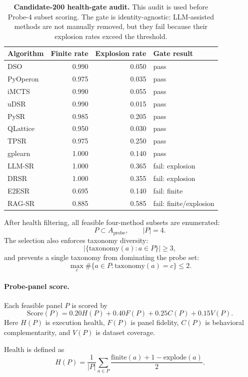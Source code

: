 \begin{table}[ht]
\centering
\small
\caption{\textbf{Candidate-200 health-gate audit.} This audit is used before Probe-4 subset scoring. The gate is identity-agnostic: LLM-assisted methods are not manually removed, but they fail because their explosion rates exceed the threshold.}
\label{tab:probe4-health-audit}
\begin{tabular}{lrrl}
\toprule
\textbf{Algorithm} & \textbf{Finite rate} & \textbf{Explosion rate} & \textbf{Gate result} \\
\midrule
DSO & 0.990 & 0.050 & pass \\
PyOperon & 0.975 & 0.035 & pass \\
iMCTS & 0.990 & 0.055 & pass \\
uDSR & 0.990 & 0.015 & pass \\
PySR & 0.985 & 0.205 & pass \\
QLattice & 0.950 & 0.030 & pass \\
TPSR & 0.975 & 0.250 & pass \\
gplearn & 1.000 & 0.140 & pass \\
LLM-SR & 1.000 & 0.365 & fail: explosion \\
DRSR & 1.000 & 0.355 & fail: explosion \\
E2ESR & 0.695 & 0.140 & fail: finite \\
RAG-SR & 0.885 & 0.585 & fail: finite/explosion \\
\bottomrule
\end{tabular}
\end{table}

After health filtering, all feasible four-method subsets are enumerated:
\[
P\subset A_{\mathrm{probe}},
\qquad
|P|=4.
\]
The selection also enforces taxonomy diversity:
\[
|\{\mathrm{taxonomy}(a):a\in P\}|\ge 3,
\]
and prevents a single taxonomy from dominating the probe set:
\[
\max_c \#\{a\in P:\mathrm{taxonomy}(a)=c\}\le 2.
\]

\paragraph{Probe-panel score.}
Each feasible panel \(P\) is scored by
\[
\mathrm{Score}(P)
=
0.20H(P)
+
0.40F(P)
+
0.25C(P)
+
0.15V(P).
\]
Here \(H(P)\) is execution health, \(F(P)\) is panel fidelity, \(C(P)\) is behavioral complementarity, and \(V(P)\) is dataset coverage.

Health is defined as
\[
H(P)
=
\frac{1}{|P|}
\sum_{a\in P}
\frac{
\mathrm{finite}(a)+1-\mathrm{explode}(a)
}{2}.
\]

